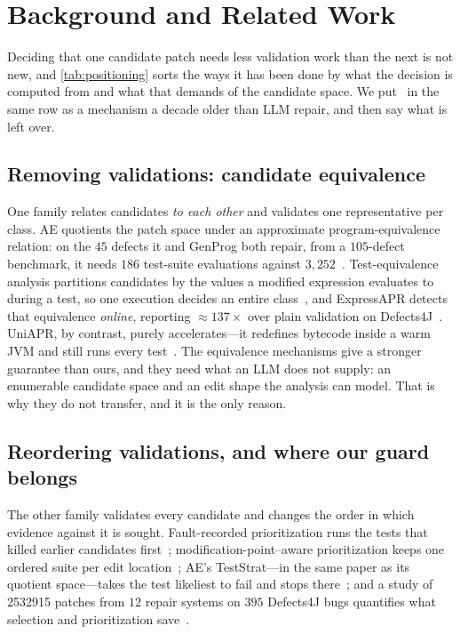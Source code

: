 \section{Background and Related Work}
\label{sec:related}

Deciding that one candidate patch needs less validation work than the next is
not new, and \cref{tab:positioning} sorts the ways it has been done by what the
decision is computed from and what that demands of the candidate space. We put
\CEGMem\ in the same row as a mechanism a decade older than LLM repair, and
then say what is left over.



\subsection{Removing validations: candidate equivalence}
\label{sec:related-avoid}
One family relates candidates \emph{to each other} and validates one
representative per class. AE quotients the patch space under an approximate
program-equivalence relation: on the $45$ defects it and GenProg both repair,
from a $105$-defect benchmark, it needs $186$ test-suite evaluations against
$3{,}252$~\cite{weimer2013leveraging}. Test-equivalence analysis partitions
candidates by the values a modified expression evaluates to during a test, so
one execution decides an entire class~\cite{mechtaev2018testequivalence}, and
ExpressAPR detects that equivalence \emph{online}, reporting
${\approx}137\times$ over plain validation on
Defects4J~\cite{xiao2024expressapr}. UniAPR, by contrast, purely
accelerates---it redefines bytecode inside a warm JVM and still runs every
test~\cite{chen2021uniapr}. The equivalence mechanisms give a stronger
guarantee than ours, and they need what an LLM does not supply: an enumerable
candidate space and an edit shape the analysis can model. That is why they do
not transfer, and it is the only reason.

\subsection{Reordering validations, and where our guard belongs}
\label{sec:related-order}
The other family validates every candidate and changes the order in which
evidence against it is sought. Fault-recorded prioritization runs the tests
that killed earlier candidates first~\cite{qi2013efficient};
modification-point--aware prioritization keeps one ordered suite per edit
location~\cite{venugopal2020modification}; AE's TestStrat---in the same paper as
its quotient space---takes the test likeliest to fail and stops
there~\cite{weimer2013leveraging}; and a study of \num{2532915} patches from
$12$ repair systems on $395$ Defects4J bugs quantifies what selection and
prioritization save~\cite{lou2024when}.

